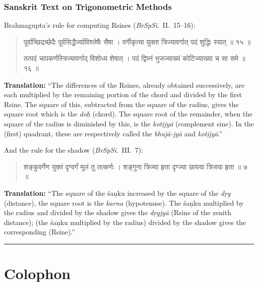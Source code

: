 \documentclass[11pt,a4paper]{article}
\newcommand{\longline}{\noindent\rule{\textwidth}{0.4pt}}
\newcommand{\dev}[1]{{\devanagarifont #1}}
\newenvironment{sanskritverse}{%
  \begin{quote}
  \devanagarifont
  \small
  \color{titlecolor}
}{\end{quote}}
\theoremstyle{definition}
\begin{document}
\subsubsection{Sanskrit Text on Trigonometric Methods}

Brahmagupta's rule for computing Rsines (\textit{BrSpSi}.\ II.\ 15--16):

\begin{sanskritverse}
\dev{पूर्वाच्छिद्रच्छेदैः पूर्वसिद्धैर्ज्याविश्लेषैः सैषा ।}
\dev{वर्गीकृत्या युक्ता त्रिज्यावर्गात् पदं शुद्धिः स्यात् ॥ १५ ॥}

\dev{तत्पदं चापकर्णस्त्रिज्यावर्गाद् विशोध्य शेषात् ।}
\dev{पदं द्विघ्नं भुजज्याख्यं कोटिज्याख्या च सा समे ॥ १६ ॥}
\end{sanskritverse}

\textbf{Translation:} ``The differences of the Rsines, already obtained successively, are each multiplied by the remaining portion of the chord and divided by the first Rsine. The square of this, subtracted from the square of the radius, gives the square root which is the \textit{do\d{h}} (chord). The square root of the remainder, when the square of the radius is diminished by this, is the \textit{kot\d{i}jy\=a} (complement sine). In the (first) quadrant, these are respectively called the \textit{bhuj\=a-jy\=a} and \textit{kot\d{i}jy\=a}.''

And the rule for the shadow (\textit{BrSpSi}.\ III.\ 7):

\begin{sanskritverse}
\dev{शङ्कुवर्गेण युक्तं दृग्वर्गं मूलं तु तत्कर्णः ।}
\dev{शङ्गुना त्रिज्या हृता दृग्ज्या छायया त्रिजया हृता ॥ ७ ॥}
\end{sanskritverse}

\textbf{Translation:} ``The square of the \'sa\d{n}ku increased by the square of the \textit{d\d{r}g} (distance), the square root is the \textit{karna} (hypotenuse). The \'sa\d{n}ku multiplied by the radius and divided by the shadow gives the \textit{d\d{r}gjy\=a} (Rsine of the zenith distance); (the \'sa\d{n}ku multiplied by the radius) divided by the shadow gives the corresponding (Rsine).''

\vspace{0.3cm}

\vspace{0.5cm}
\longline

\newpage
\section*{Colophon}
\end{document}
